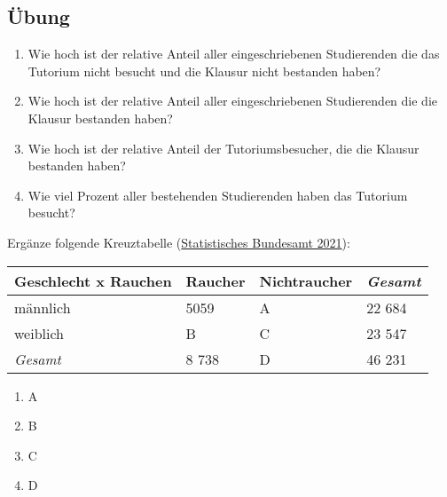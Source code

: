  \subsection{Übung}
  \begin{enumerate}
    \item Wie hoch ist der relative Anteil aller eingeschriebenen Studierenden die das Tutorium nicht besucht und die Klausur nicht bestanden haben?

    \item Wie hoch ist der relative Anteil aller eingeschriebenen Studierenden die die Klausur bestanden haben?

    \item Wie hoch ist der relative Anteil der Tutoriumsbesucher, die die Klausur bestanden haben?

    \item Wie viel Prozent aller bestehenden Studierenden haben das Tutorium besucht?
 \end{enumerate}
\vspace{1cm}
Ergänze folgende Kreuztabelle (\href{https://www.destatis.de/DE/Themen/Gesellschaft-Umwelt/Gesundheit/Gesundheitszustand-Relevantes-Verhalten/Tabellen/liste-rauchverhalten.html#119170}{Statistisches Bundesamt 2021}):\\
\begin{tabular}{p{2cm}|p{2cm}|p{2cm}|p{2cm}}
   Geschlecht x Rauchen & Raucher            & Nichtraucher           & \textit{Gesamt}
\\\hline
   männlich             & 5059               & A                      & 22 684
\\\hline
   weiblich             & B                  & C                      & 23 547
\\\hline
   \textit{Gesamt}      & 8 738              & D                      & 46 231
\end{tabular}

\begin{enumerate}
  \item A 
  \item B 
  \item C 
  \item D 
\end{enumerate}
